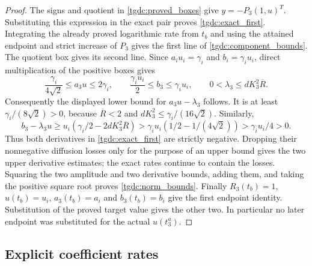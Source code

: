 \documentclass[11pt]{article}
\begin{document}
\begin{proof}
The signs and quotient in \eqref{tgdc:proved_boxes} give
$y=-P_3(1,u)^T$. Substituting this expression in the exact pair proves
\eqref{tgdc:exact_first}. Integrating the already proved logarithmic
rate from $t_b$ and using the attained endpoint and strict increase
of $P_3$ gives the first line of \eqref{tgdc:component_bounds}.
The quotient box gives its second line. Since $a_i u_i=\gamma_i$
and $b_i=\gamma_i u_i$, direct multiplication of the positive boxes
gives
\[
 \frac{\gamma_i}{4\sqrt2}\leq a_3u\leq2\gamma_i,
 \qquad
 \frac{\gamma_i u_i}{2}\leq b_3\leq\gamma_i u_i,
 \qquad 0<\lambda_3\leq dK_3^2\overline R.
\]
Consequently the displayed lower bound for $a_3u-\lambda_3$ follows.
It is at least $\gamma_i/(8\sqrt2)>0$, because
$\overline R<2$ and $dK_3^2\leq\gamma_i/(16\sqrt2)$.
Similarly,
\[
 b_3-\lambda_3u
 \geq u_i(\gamma_i/2-2dK_3^2\overline R)
 >\gamma_i u_i(1/2-1/(4\sqrt2))
 >\gamma_i u_i/4>0.
\]
Thus both derivatives in \eqref{tgdc:exact_first} are strictly negative.
Dropping their nonnegative diffusion losses only for the purpose of
an upper bound gives the two upper derivative estimates; the exact
rates continue to contain the losses. Squaring the two amplitude and
two derivative bounds, adding them, and taking the positive square
root proves \eqref{tgdc:norm_bounds}. Finally $R_3(t_b)=1$,
$u(t_b)=u_i$, $a_3(t_b)=a_i$ and $b_3(t_b)=b_i$ give the first
endpoint identity. Substitution of the proved target value gives
the other two. In particular no later endpoint was substituted for
the actual $u(t_3^a)$.
\end{proof}

\subsection{Explicit coefficient rates}
\end{document}
